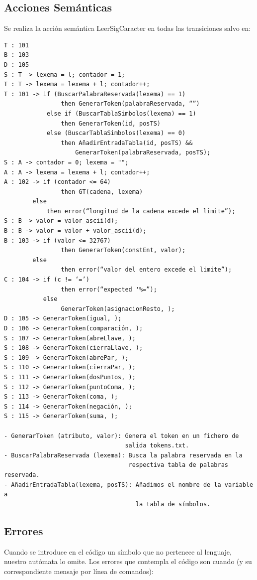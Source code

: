\documentclass{article}[a4paper]
\begin{document}
\subsection{Acciones Semánticas}
Se realiza la acción semántica LeerSigCaracter en todas las transiciones 
salvo en:
\begin{verbatim}
T : 101
B : 103
D : 105
S : T -> lexema = l; contador = 1;
T : T -> lexema = lexema + l; contador++;
T : 101 -> if (BuscarPalabraReservada(lexema) == 1) 
                then GenerarToken(palabraReservada, “”)
            else if (BuscarTablaSimbolos(lexema) == 1) 
                then GenerarToken(id, posTS)
            else (BuscarTablaSimbolos(lexema) == 0) 
                then AñadirEntradaTabla(id, posTS) && 
                    GenerarToken(palabraReservada, posTS);
S : A -> contador = 0; lexema = "";
A : A -> lexema = lexema + l; contador++;
A : 102 -> if (contador <= 64) 
                then GT(cadena, lexema)
	    else
	        then error(“longitud de la cadena excede el limite”);
S : B -> valor = valor_ascii(d);
B : B -> valor = valor + valor_ascii(d);
B : 103 -> if (valor <= 32767)
                then GenerarToken(constEnt, valor);
	    else
                then error(“valor del entero excede el limite”);
C : 104 -> if (c != ‘=’)
                then error(“expected '%=”);
           else
                GenerarToken(asignacionResto, );
D : 105 -> GenerarToken(igual, );
D : 106 -> GenerarToken(comparación, );
S : 107 -> GenerarToken(abreLlave, );
S : 108 -> GenerarToken(cierraLlave, );
S : 109 -> GenerarToken(abrePar, );
S : 110 -> GenerarToken(cierraPar, );
S : 111 -> GenerarToken(dosPuntos, );
S : 112 -> GenerarToken(puntoComa, );
S : 113 -> GenerarToken(coma, );
S : 114 -> GenerarToken(negación, );
S : 115 -> GenerarToken(suma, );

- GenerarToken (atributo, valor): Genera el token en un fichero de 
                                  salida tokens.txt.
- BuscarPalabraReservada (lexema): Busca la palabra reservada en la 
                                   respectiva tabla de palabras reservada.
- AñadirEntradaTabla(lexema, posTS): Añadimos el nombre de la variable a 
                                     la tabla de símbolos.
\end{verbatim}

\subsection{Errores}
Cuando se introduce en el código un símbolo que no pertenece al lenguaje, nuestro autómata lo omite. Los errores que contempla el código son cuando (y su correspondiente mensaje por línea de comandos):\\
\end{document}
